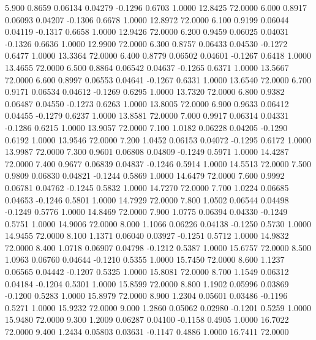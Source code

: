    5.900   0.8659   0.06134   0.04279  -0.1296   0.6703   1.0000  12.8425  72.0000
   6.000   0.8917   0.06093   0.04207  -0.1306   0.6678   1.0000  12.8972  72.0000
   6.100   0.9199   0.06044   0.04119  -0.1317   0.6658   1.0000  12.9426  72.0000
   6.200   0.9459   0.06025   0.04031  -0.1326   0.6636   1.0000  12.9900  72.0000
   6.300   0.8757   0.06433   0.04530  -0.1272   0.6477   1.0000  13.3364  72.0000
   6.400   0.8779   0.06502   0.04601  -0.1267   0.6418   1.0000  13.4655  72.0000
   6.500   0.8864   0.06542   0.04637  -0.1265   0.6371   1.0000  13.5667  72.0000
   6.600   0.8997   0.06553   0.04641  -0.1267   0.6331   1.0000  13.6540  72.0000
   6.700   0.9171   0.06534   0.04612  -0.1269   0.6295   1.0000  13.7320  72.0000
   6.800   0.9382   0.06487   0.04550  -0.1273   0.6263   1.0000  13.8005  72.0000
   6.900   0.9633   0.06412   0.04455  -0.1279   0.6237   1.0000  13.8581  72.0000
   7.000   0.9917   0.06314   0.04331  -0.1286   0.6215   1.0000  13.9057  72.0000
   7.100   1.0182   0.06228   0.04205  -0.1290   0.6192   1.0000  13.9546  72.0000
   7.200   1.0452   0.06153   0.04072  -0.1295   0.6172   1.0000  13.9987  72.0000
   7.300   0.9601   0.06808   0.04809  -0.1249   0.5971   1.0000  14.4287  72.0000
   7.400   0.9677   0.06839   0.04837  -0.1246   0.5914   1.0000  14.5513  72.0000
   7.500   0.9809   0.06830   0.04821  -0.1244   0.5869   1.0000  14.6479  72.0000
   7.600   0.9992   0.06781   0.04762  -0.1245   0.5832   1.0000  14.7270  72.0000
   7.700   1.0224   0.06685   0.04653  -0.1246   0.5801   1.0000  14.7929  72.0000
   7.800   1.0502   0.06544   0.04498  -0.1249   0.5776   1.0000  14.8469  72.0000
   7.900   1.0775   0.06394   0.04330  -0.1249   0.5751   1.0000  14.9006  72.0000
   8.000   1.1066   0.06226   0.04138  -0.1250   0.5730   1.0000  14.9455  72.0000
   8.100   1.1371   0.06040   0.03927  -0.1251   0.5712   1.0000  14.9832  72.0000
   8.400   1.0718   0.06907   0.04798  -0.1212   0.5387   1.0000  15.6757  72.0000
   8.500   1.0963   0.06760   0.04644  -0.1210   0.5355   1.0000  15.7450  72.0000
   8.600   1.1237   0.06565   0.04442  -0.1207   0.5325   1.0000  15.8081  72.0000
   8.700   1.1549   0.06312   0.04184  -0.1204   0.5301   1.0000  15.8599  72.0000
   8.800   1.1902   0.05996   0.03869  -0.1200   0.5283   1.0000  15.8979  72.0000
   8.900   1.2304   0.05601   0.03486  -0.1196   0.5271   1.0000  15.9232  72.0000
   9.000   1.2860   0.05062   0.02980  -0.1201   0.5259   1.0000  15.9480  72.0000
   9.300   1.2009   0.06287   0.04100  -0.1158   0.4905   1.0000  16.7022  72.0000
   9.400   1.2434   0.05803   0.03631  -0.1147   0.4886   1.0000  16.7411  72.0000
